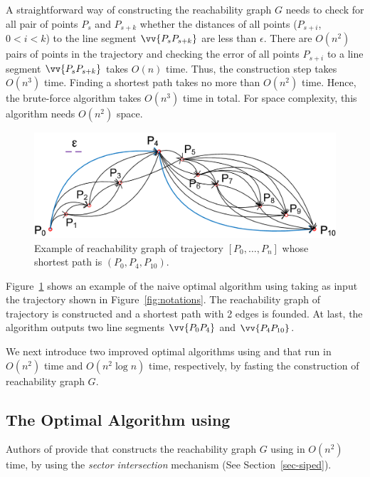 A straightforward way of constructing the reachability graph $G$ needs to check for all pair of points $P_s$ and $P_{s+k}$ whether the distances of all points ($P_{s+i}$, $0<i<k$) to the line segment $\vv{P_sP_{s+k}}$ are less than $\epsilon$.
There are $O(n^2)$ pairs of points in the trajectory and checking the error of all points $P_{s+i}$ to a line segment $\vv{P_sP_{s+k}}$ takes $O(n)$ time.
Thus, the construction step takes $O(n^3)$ time.
Finding a shortest path takes no more than $O(n^2)$ time. Hence, the brute-force algorithm takes $O(n^3)$ time in total.
For space complexity, this algorithm needs $O(n^2)$ space.

\begin{figure}[tb!]
	\centering
	\includegraphics[scale=0.75]{figures/Fig-Optimal.png}
	\vspace{-1ex}
	\caption{\small Example of reachability graph of trajectory $[P_0, \ldots, P_n]$ whose shortest path is $(P_0, P_4, P_{10})$.}
	\vspace{-1ex}
	\label{fig:optimal}
\end{figure}

\begin{example}
	\label{exm-alg-optimal}
	Figure~\ref{fig:optimal} shows an example of the naive optimal \lsa algorithm using \ped taking as input the trajectory  shown in Figure~\ref{fig:notations}. The reachability graph of trajectory  is constructed and a shortest path with 2 edges is founded. 
	At last, the algorithm outputs two line segments $\vv{P_0P_4}$ and $\vv{P_4P_{10}}$.	
\end{example}

We next introduce two improved optimal \lsa algorithms using \ped and \sed that run in $O(n^2)$ time and $O(n^2 \log n)$ time, respectively, by fasting the construction of reachability graph $G$.

\subsection{The Optimal Algorithm using \ped}
Authors of \cite{Chan:Optimal} provide \oped that constructs the reachability graph $G$ using \ped in $O(n^2)$ time, by using the \textit{sector intersection} mechanism (See Section~\ref{sec-siped}). 

